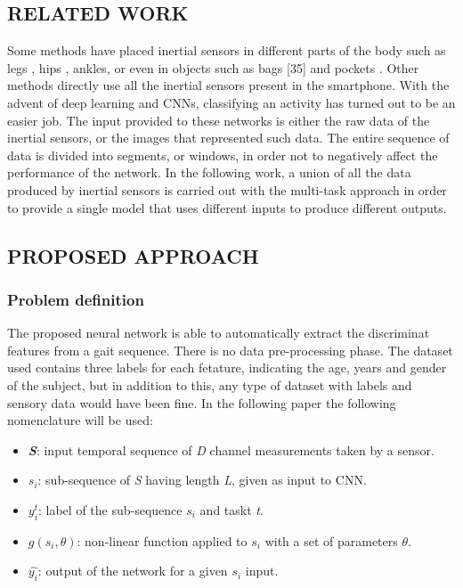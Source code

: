\subsection{RELATED WORK}
Some methods have placed inertial sensors in different parts of the body 
such as legs \cite{0857651733}, hips \cite{0857651732}, ankles, or even in objects such as bags [35] and 
pockets \cite{0857651720}. Other methods \cite{0857651736} directly use all the inertial sensors present 
in the smartphone. With the advent of deep learning and CNNs, classifying 
an activity has turned out to be an easier job. The input provided to these 
networks is either the raw data of the inertial sensors, or the images that 
represented such data. The entire sequence of data is divided into segments, 
or windows, in order not to negatively affect the performance of the network. 
In the following work, a union of all the data produced by inertial sensors is 
carried out with the multi-task approach in order to provide a single model 
that uses different inputs to produce different outputs.

\subsection{PROPOSED APPROACH}
\subsubsection{Problem definition}
The proposed neural network is able to automatically extract the discriminat 
features from a gait sequence. There is no data pre-processing phase. The 
dataset used contains three labels for each fetature, indicating the age, years 
and gender of the subject, but in addition to this, any type of dataset with 
labels and sensory data would have been fine. In the following paper the 
following nomenclature will be used:
\begin{itemize}
    \item {\bfseries{\emph{S}}}: input temporal sequence of \emph{D} channel measurements taken by a sensor.
    \item {\bfseries{$ s_i $}}: sub-sequence of \emph{S} having length \emph{L}, given as input to CNN.
    \item $ y_i^t $: label of the sub-sequence $ s_i $ and taskt \emph{t}.
    \item $ g(s_i, \theta ) $: non-linear function applied to $ s_i $ with a set of parameters $ \theta $.
    \item {\bfseries{$ \hat{y_i} $}}: output of the network for a given $ s_i $ input.
\end{itemize}

